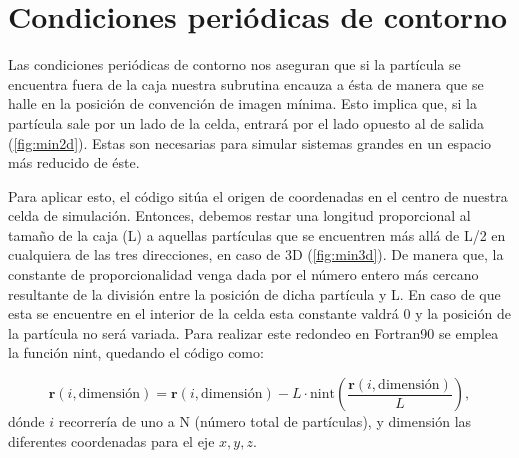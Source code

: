 \documentclass[onecolumn]{article}
\renewcommand{\vec}[1]{\mathbf{#1}}
\begin{document}
\section{Condiciones periódicas de contorno}

Las condiciones periódicas de contorno nos aseguran que si la partícula se encuentra fuera de la caja nuestra subrutina encauza a ésta de manera que se halle en la posición de convención de imagen mínima. Esto implica que, si la partícula sale por un lado de la celda, entrará por el lado opuesto al de salida (\autoref{fig:min2d}). Estas son necesarias para simular sistemas grandes en un espacio más reducido de éste.

Para aplicar esto, el código sitúa el origen de coordenadas en el centro de nuestra celda de simulación. Entonces, debemos restar una longitud proporcional al tamaño de la caja (L) a aquellas partículas que se encuentren más allá de L/2 en cualquiera de las tres direcciones, en caso de 3D (\autoref{fig:min3d}). De manera que, la constante de proporcionalidad venga dada por el número entero más cercano resultante de la división entre la posición de dicha partícula y L. En caso de que esta se encuentre en el interior de la celda esta constante valdrá 0 y la posición de la partícula no será variada. Para realizar este redondeo en Fortran90 se emplea la función nint, quedando el código como: 

\begin{equation}
\vec{r}(i,\text{dimensión}) = \vec{r}(i,\text{dimensión}) - L\cdot \text{nint}\left(\frac{\vec{r}(i,\text{dimensión})}{L}\right) ,
\end{equation}
dónde $i$ recorrería de uno a N (número total de partículas), y dimensión las diferentes coordenadas para el eje $x,y,z$.
\end{document}
